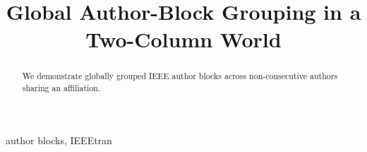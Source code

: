 \title{Global Author-Block Grouping in a Two-Column World}
\author{
}
\maketitle
\begin{abstract}
We demonstrate globally grouped IEEE author blocks across non-consecutive authors sharing an affiliation.
\end{abstract}
\begin{IEEEkeywords}
author blocks, IEEEtran
\end{IEEEkeywords}
